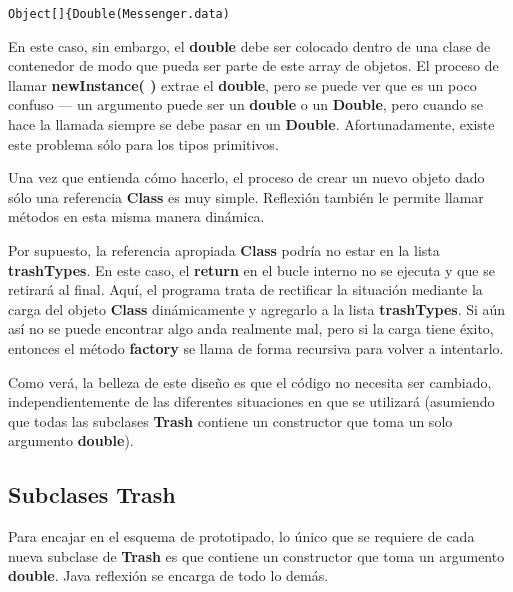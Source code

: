 \begin{lstlisting} 
Object[]{Double(Messenger.data)
\end{lstlisting}

En este caso, sin embargo, el \textbf{double} debe ser colocado dentro de una clase de contenedor de modo que pueda ser parte de este array de objetos. El proceso de llamar \textbf{newInstance( )} extrae el \textbf{double}, pero se puede ver que es un poco confuso — un argumento puede ser un \textbf{double} o un \textbf{Double}, pero cuando se hace la llamada siempre se debe pasar en un \textbf{Double}. Afortunadamente, existe este problema sólo para los tipos primitivos.   \newline

Una vez que entienda cómo hacerlo, el proceso de crear un nuevo objeto dado sólo una referencia \textbf{Class} es muy simple. Reflexión también le permite llamar métodos en esta misma manera dinámica.      \newline

Por supuesto, la referencia apropiada \textbf{Class} podría no estar en la lista \textbf{trashTypes}. En este caso, el \textbf{return} en el bucle interno no se ejecuta y que se retirará al final. Aquí, el programa trata de rectificar la situación mediante la carga del objeto \textbf{Class} dinámicamente y agregarlo a la lista \textbf{trashTypes}. Si aún así no se puede encontrar algo anda realmente mal, pero si la carga tiene éxito, entonces el método  \textbf{factory} se llama de forma recursiva para volver a intentarlo.    \newline

Como verá, la belleza de este diseño es que el código no necesita ser cambiado, independientemente de las diferentes situaciones en que se utilizará (asumiendo que todas las subclases \textbf{Trash} contiene un constructor que toma un solo argumento \textbf{double}).     \newline


\subsection*{Subclases \textbf{Trash}}
\label{subsec:st}



Para encajar en el esquema de prototipado, lo único que se requiere de cada nueva subclase de \textbf{Trash} es que contiene un constructor que toma un argumento \textbf{double}. Java reflexión se encarga de todo lo demás.    \newline


